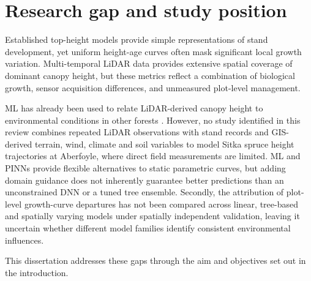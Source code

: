 \section{Research gap and study position}
\label{sec:background-gap}

Established top-height models provide simple representations of stand development, yet uniform height-age curves often mask significant local growth variation. Multi-temporal LiDAR data provides extensive spatial coverage of dominant canopy height, but these metrics reflect a combination of biological growth, sensor acquisition differences, and unmeasured plot-level management.

ML has already been used to relate LiDAR-derived canopy height to environmental conditions in other forests \citep{fricker2019More_C3_LID}. However, no study identified in this review combines repeated LiDAR observations with stand records and GIS-derived terrain, wind, climate and soil variables to model Sitka spruce height trajectories at Aberfoyle, where direct field measurements are limited. ML and PINNs provide flexible alternatives to static parametric curves, but adding domain guidance does not inherently guarantee better predictions than an unconstrained DNN or a tuned tree ensemble. Secondly, the attribution of plot-level growth-curve departures has not been compared across linear, tree-based and spatially varying models under spatially independent validation, leaving it uncertain whether different model families identify consistent environmental influences.

This dissertation addresses these gaps through the aim and objectives set out in the introduction.

